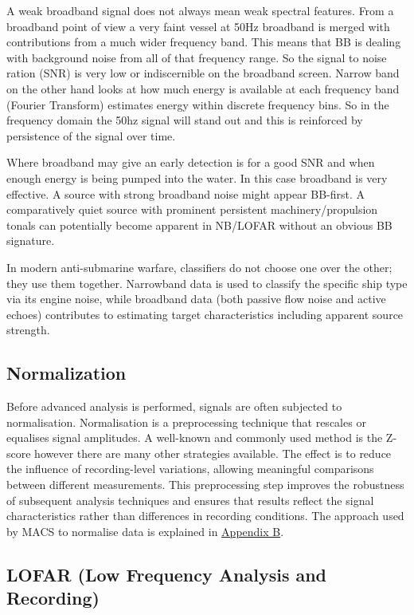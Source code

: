 A weak broadband signal does not always mean weak spectral features. From a broadband point of view a very faint vessel at 50Hz broadband is merged with contributions from a much wider frequency band. This means that BB is dealing with background noise from all of that frequency range. So the signal to noise ration (SNR) is very low or indiscernible on the broadband screen. Narrow band on the other hand looks at how much energy is available at each frequency band (Fourier Transform) estimates energy within discrete frequency bins. So in the frequency domain the 50hz signal will stand out and this is reinforced by persistence of the signal over time.

Where broadband may give an early detection is for a good SNR and when enough energy is being pumped into the water. In this case broadband is very effective. A source with strong broadband noise might appear BB-first. A comparatively quiet source with prominent persistent machinery/propulsion tonals can potentially become apparent in NB/LOFAR without an obvious BB signature.

\begin{learnpoint}
    In modern anti-submarine warfare, classifiers do not choose one over the other; they use them together. Narrowband data is used to classify the specific ship type via its engine noise, while broadband data (both passive flow noise and active echoes) contributes to estimating target characteristics including apparent source strength.
\end{learnpoint}

\subsection{Normalization}

Before advanced analysis is performed, signals are often subjected to normalisation. Normalisation is a preprocessing technique that rescales or equalises signal amplitudes. A well-known and commonly used method is the Z-score however there are many other strategies available. The effect is to reduce the influence of recording-level variations, allowing meaningful comparisons between different measurements. This preprocessing step improves the robustness of subsequent analysis techniques and ensures that results reflect the signal characteristics rather than differences in recording conditions. The approach used by MACS to normalise data is explained in \hyperref[sec:Appendix_B]{Appendix B}.

\subsection{LOFAR (Low Frequency Analysis and Recording)}

